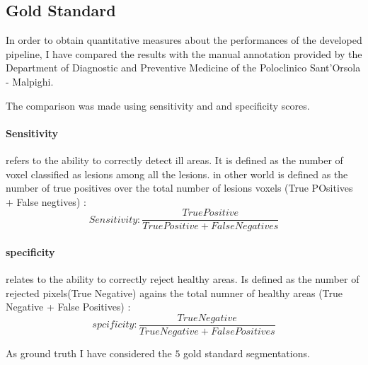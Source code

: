 \documentclass{standalone}
\begin{document}
	\subsection{Gold Standard}
	
	In order to obtain quantitative measures about the performances of the developed pipeline, I have compared the results with the manual annotation provided by the Department of Diagnostic and Preventive Medicine of the Poloclinico Sant'Orsola - Malpighi. 
	
	The comparison was made using sensitivity and and specificity scores. 
	\paragraph{Sensitivity} refers to the ability to correctly detect ill areas. It is defined as the number of voxel classified as lesions among all the lesions. in other world is defined as the number of true positives over the total number of lesions voxels (True POsitives + False negtives) : 
	\begin{equation}\label{eq:sensitivity}
		Sensitivity : \frac{True Positive}{True Positive + False Negatives}
	\end{equation}

	\paragraph{specificity} relates to the  ability to correctly reject healthy areas. Is defined as the number of rejected pixels(True Negative) agains the total numner of healthy areas (True Negative + False Positives) : 
	\begin{equation}
		spcificity : \frac{True Negative}{True Negative + False Positives}
	\end{equation}
	
	As ground truth I have considered the $5$ gold standard segmentations.
	
\end{document}
